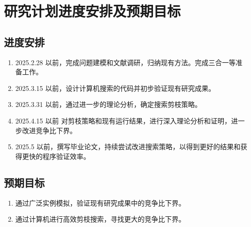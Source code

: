 \section{研究计划进度安排及预期目标}

\subsection{进度安排}

\begin{enumerate}
    \item 2025.2.28 以前，完成问题建模和文献调研，归纳现有方法。完成三合一等准备工作。
    \item 2025.3.15 以前，设计计算机搜索的代码并初步验证现有研究成果。
    \item 2025.3.31 以前，通过进一步的理论分析，确定搜索剪枝策略。
    \item 2025.4.15 以前 对剪枝策略和现有运行结果，进行深入理论分析和证明，进一步改进竞争比下界。
    \item 2025.5 以前，撰写毕业论文，持续尝试改进搜索策略，以得到更好的结果和获得更快的程序验证效率。
\end{enumerate}

\subsection{预期目标}

\begin{enumerate}
    \item 通过广泛实例模拟，验证现有研究成果中的竞争比下界。
    \item 通过计算机进行高效剪枝搜索，寻找更大的竞争比下界。
\end{enumerate}